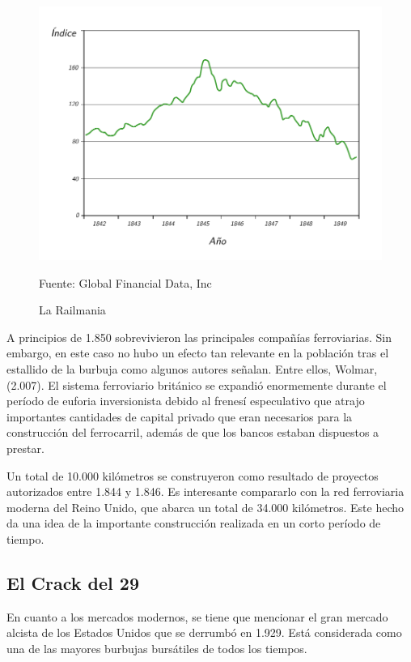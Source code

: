 \begin{figure}[!h] 
\caption{La Railmania} 
\centering \includegraphics[width=150mm]{capitulos/graficos/LaRailmania} 
\label{fig:La Railmania} 

	\footnotesize
	Fuente: Global Financial Data, Inc

\end{figure}

A principios de 1.850 sobrevivieron las principales compañías ferroviarias. Sin embargo, en este caso no hubo un efecto tan relevante en la población tras el estallido de la burbuja como algunos autores señalan. Entre ellos, Wolmar, (2.007). El sistema ferroviario británico se expandió enormemente durante el período de euforia inversionista debido al frenesí especulativo que atrajo importantes cantidades de capital privado que eran necesarios para la construcción del ferrocarril, además de que los bancos estaban dispuestos a prestar.

Un total de 10.000 kilómetros se construyeron como resultado de proyectos autorizados entre 1.844 y 1.846. Es interesante compararlo con la red ferroviaria moderna del Reino Unido, que abarca un total de 34.000 kilómetros. Este hecho da una idea de la importante construcción realizada en un corto período de tiempo.

\subsection{El Crack del 29}  

En cuanto a los mercados modernos, se tiene que mencionar el gran mercado alcista de los Estados Unidos que se derrumbó en 1.929. Está considerada como una de las mayores burbujas bursátiles de todos los tiempos.

